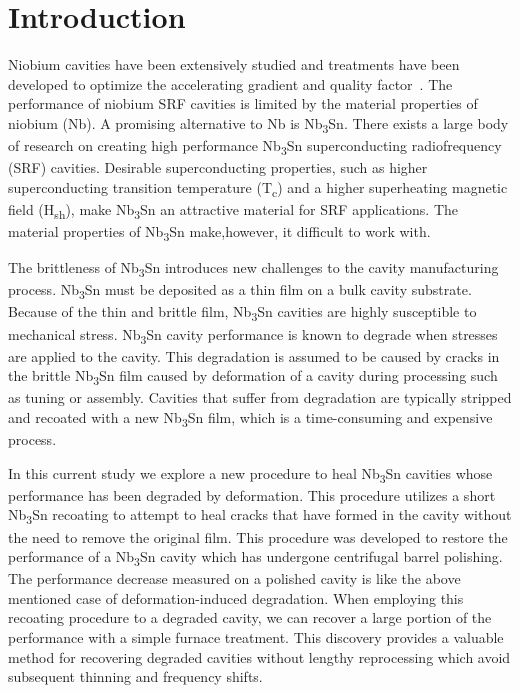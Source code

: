 \section{Introduction}
\label{sec:Introduction}

Niobium cavities have been extensively studied and treatments have been developed to optimize the accelerating gradient and quality factor~\cite{10.1063/1.4866013, 10.1063/1.4960801, 10.1063/5.0059464, 10.1063/5.0063379}. The performance of niobium SRF cavities is limited by the material properties of niobium (Nb). A promising alternative to Nb is Nb\textsubscript{3}Sn. There exists a large body of research on creating high performance Nb\textsubscript{3}Sn superconducting radiofrequency (SRF) cavities\cite{10.1063/1.4913617, 10.1063/1.4913247}. Desirable superconducting properties, such as higher superconducting transition temperature (T\textsubscript{c}) and a higher superheating magnetic field (H\textsubscript{sh})\cite{liarte2017theoretical, catelani2008temperature, lin2012effect, kubo2020superfluid}, make Nb\textsubscript{3}Sn an attractive material for SRF applications. The material properties of Nb\textsubscript{3}Sn make,however, it difficult to work with. 

The brittleness of Nb\textsubscript{3}Sn introduces new challenges to the cavity manufacturing process. Nb\textsubscript{3}Sn must be deposited as a thin film on a bulk cavity substrate\cite{posen2017nb3sn, pudasaini2019growth, porter2018update}. Because of the thin and brittle film, Nb\textsubscript{3}Sn cavities are highly susceptible to mechanical stress. Nb\textsubscript{3}Sn cavity performance is known to degrade when stresses are applied to the cavity\cite{eremeev2023preservation, eremeev:srf2019-mop015}. This degradation is assumed to be caused by cracks in the brittle Nb\textsubscript{3}Sn film caused by deformation of a cavity during processing such as tuning or assembly. Cavities that suffer from degradation are typically stripped and recoated with a new Nb\textsubscript{3}Sn film, which is a time-consuming and expensive process.

In this current study we explore a new procedure to heal Nb\textsubscript{3}Sn cavities whose performance has been degraded by deformation. This procedure utilizes a short Nb\textsubscript{3}Sn recoating to attempt to heal cracks that have formed in the cavity without the need to remove the original film. This procedure was developed to restore the performance of a Nb\textsubscript{3}Sn cavity which has undergone centrifugal barrel polishing\cite{viklund2024improving}. The performance decrease measured on a polished cavity is like the above mentioned case of deformation-induced degradation. When employing this recoating procedure to a degraded cavity, we can recover a large portion of the performance with a simple furnace treatment. This discovery provides a valuable method for recovering degraded cavities without lengthy reprocessing which avoid subsequent thinning and frequency shifts.


